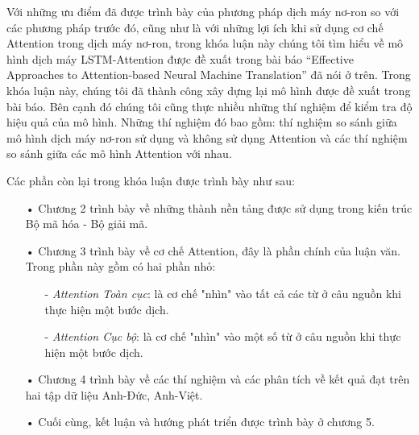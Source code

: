 

Với những ưu điểm đã được trình bày của phương pháp dịch máy nơ-ron so với các phương pháp trước đó, cũng như là với những lợi ích khi sử dụng cơ chế Attention trong dịch máy nơ-ron, trong khóa luận này chúng tôi tìm hiểu về mô hình dịch máy LSTM-Attention được đề xuất trong bài báo “Effective Approaches to Attention-based Neural Machine Translation” \cite{attentionThangLuong2015} đã nói ở trên. Trong khóa luận này, chúng tôi đã thành công xây dựng lại mô hình được đề xuất trong bài báo. Bên cạnh đó chúng tôi cũng thực nhiều những thí nghiệm để kiểm tra độ hiệu quả của mô hình. Những thí nghiệm đó bao gồm: thí nghiệm so sánh giữa mô hình dịch máy nơ-ron sử dụng và không sử dụng Attention và các thí nghiệm so sánh giữa các mô hình Attention với nhau.

Các phần còn lại trong khóa luận được trình bày như sau:
\begin{itemize}
	\item[•] Chương 2 trình bày về những thành nền tảng được sử dụng trong kiến trúc Bộ mã hóa - Bộ giải mã.
	
	\item[•] Chương 3 trình bày về cơ chế Attention, đây là phần chính của luận văn. Trong phần này gồm có hai phần nhỏ:
		\begin{itemize}
			\item[-] \textit{Attention Toàn cục}: là cơ chế "nhìn" vào tất cả các từ ở câu nguồn khi thực hiện một bước dịch. 
			\item[-] \textit{Attention Cục bộ}: là cơ chế "nhìn" vào một số từ ở câu nguồn khi thực hiện một bước dịch.
		\end{itemize}
	\item[•] Chương 4 trình bày về các thí nghiệm và các phân tích về kết quả đạt trên hai tập dữ liệu Anh-Đức, Anh-Việt.
	\item[•] Cuối cùng, kết luận và hướng phát triển được trình bày ở chương 5.
\end{itemize}





